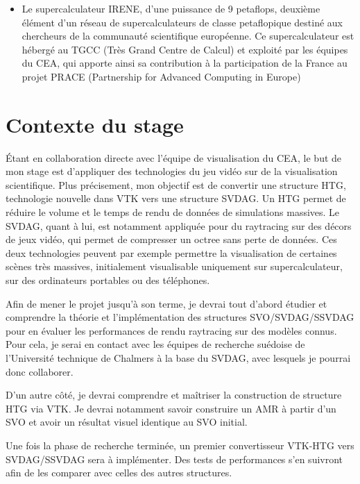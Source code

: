 \documentclass[12pt,a4paper,twoside]{article}
\begin{document}
\begin{itemize}[label=\textbullet]
        \item
        Le supercalculateur IRENE, d’une puissance de 9 petaflops, deuxième élément d’un réseau de supercalculateurs de classe petaflopique destiné aux chercheurs de la communauté scientifique européenne. Ce supercalculateur est hébergé au TGCC (Très Grand Centre de Calcul) et exploité par les équipes du CEA, qui apporte ainsi sa contribution à la participation de la France au projet PRACE (Partnership for Advanced Computing in Europe)

    \end{itemize}



    \newpage


    \newpage
    \section{Contexte du stage}                 %

    Étant en collaboration directe avec l'équipe de visualisation du CEA, le but de mon stage est d'appliquer
    des technologies du jeu vidéo sur de la visualisation scientifique. Plus précisement, mon objectif est de convertir
    une structure HTG, technologie nouvelle dans VTK vers une structure SVDAG.
    Un HTG permet de réduire le volume et le temps de rendu de données de simulations massives. Le SVDAG, quant à lui, est notamment appliquée pour
    du raytracing sur des décors de jeux vidéo, qui permet de compresser un octree sans perte de données. Ces deux technologies peuvent par exemple
    permettre la visualisation de certaines scènes très massives, initialement visualisable uniquement sur supercalculateur, sur des ordinateurs portables ou des téléphones.

    Afin de mener le projet jusqu'à son terme, je devrai tout d'abord étudier et comprendre la théorie et l'implémentation des structures
    SVO/SVDAG/SSVDAG pour en évaluer les performances de rendu raytracing sur des modèles connus. Pour cela, je serai en contact
    avec les équipes de recherche suédoise de l'Université technique de Chalmers à la base du SVDAG, avec lesquels je pourrai donc collaborer.

    D'un autre côté, je devrai comprendre et maîtriser la construction de structure HTG via VTK. Je devrai notamment
    savoir construire un AMR à partir d'un SVO et avoir un résultat visuel identique au SVO initial.

    Une fois la phase de recherche terminée, un premier convertisseur VTK-HTG vers SVDAG/SSVDAG sera à
    implémenter. Des tests de performances s'en suivront afin de les comparer avec celles des autres structures.
\end{document}
